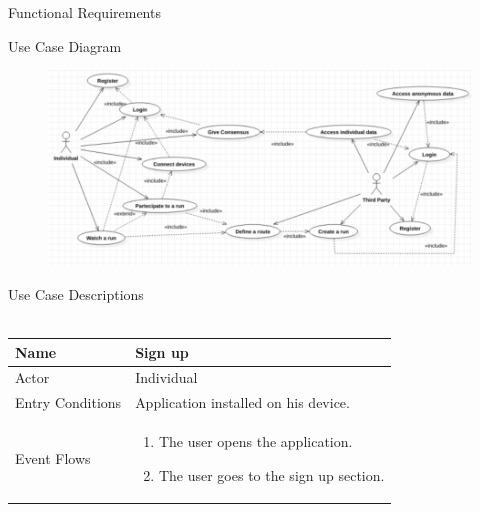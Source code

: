 \documentclass{article}
\begin{document}
\begin{legal}
\begin{legal}
    		\item Functional Requirements\\
    		\begin{legal}\bfseries
    			\item Use Case Diagram
    			\begin{figure}[H]
			  	\includegraphics[width=\linewidth]{./images/usecase.png}
				\end{figure}
				\item Use Case Descriptions\\\\
				\begin{tabular}{| m{3.5cm} | m{8cm}| }
				\hline
					Name & Sign up\\
				\hline
					Actor & Individual\\
				\hline
					Entry Conditions & Application installed
				on his device.\\
				\hline
					Event Flows & \begin{enumerate}
									\item The user opens the application.
									\item The user goes to the sign up section.
									

\end{enumerate}
\end{tabular}
\end{legal}
\end{legal}
\end{legal}
\end{document}
